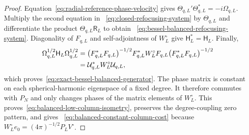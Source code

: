 \documentclass[11pt]{article}
\theoremstyle{definition}
\theoremstyle{remark}
\begin{document}
\begin{proof}
Equation~\eqref{eq:radial-reference-phase-velocity} gives
$\Theta_{q,L}'\Theta_{q,L}^*=-i\Omega_{q,L}$.  Multiply the second equation in
~\eqref{eq:closed-refocusing-system} by $\Theta_{q,L}$ and differentiate the
product $\Theta_{q,L}\mathsf R_L$ to obtain
~\eqref{eq:bessel-balanced-refocusing-system}.  Diagonality of $F_{q,L}$ and
self-adjointness of $W_L^\circ$ give $\mathsf H_L^*=\mathsf H_L$.  Finally,
\begin{align}
 \Omega_{q,L}^{1/2}\mathsf H_L\Omega_{q,L}^{1/2}
 &=\bigl(F_{q,L}^*F_{q,L}\bigr)^{-1/2}
    F_{q,L}^*W_L^\circ F_{q,L}
    \bigl(F_{q,L}^*F_{q,L}\bigr)^{-1/2}\notag\\
 &=\mathcal U_{q,L}^*W_L^\circ\mathcal U_{q,L},
\end{align}
which proves~\eqref{eq:exact-bessel-balanced-generator}.  The phase matrix is
constant on each spherical-harmonic eigenspace of a fixed degree.  It therefore
commutes with $P_N$ and only changes phases of the matrix elements of
$W_L^\circ$.  This proves~\eqref{eq:balanced-low-column-isometry}, preserves the
degree-coupling zero pattern, and gives
~\eqref{eq:balanced-constant-column-cost} because
$W_L^\circ e_0=(4\pi)^{-1/2}P_LV^\circ$.
\end{proof}
\end{document}
